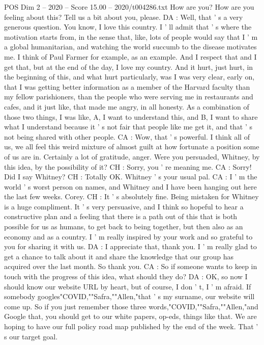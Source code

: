 \begin{textsample}{POS Dim 2 – 2020 – Score 15.00 – 2020/t004286.txt}
How are you?
How are you feeling about this?
Tell us a bit about you, please.
DA : Well, that ' s a very generous question.
You know, I love this country.
I ' ll admit that ' s where the motivation starts from, in the sense that, like, lots of people would say that I ' m a global humanitarian, and watching the world succumb to the disease motivates me.
I think of Paul Farmer for example, as an example.
And I respect that and I get that, but at the end of the day, I love my country.
And it hurt, just hurt, in the beginning of this, and what hurt particularly, was I was very clear, early on, that I was getting better information as a member of the Harvard faculty than my fellow parishioners, than the people who were serving me in restaurants and cafes, and it just like, that made me angry, in all honesty.
As a combination of those two things, I was like, A, I want to understand this, and B, I want to share what I understand because it ' s not fair that people like me get it, and that ' s not being shared with other people.
CA : Wow, that ' s powerful.
I think all of us, we all feel this weird mixture of almost guilt at how fortunate a position some of us are in.
Certainly a lot of gratitude, anger.
Were you persuaded, Whitney, by this idea, by the possibility of it?
CH : Sorry, you ' re meaning me.
CA : Sorry!
Did I say Whitney?
CH : Totally OK.
Whitney ' s your usual pal.
CA : I ' m the world ' s worst person on names, and Whitney and I have been hanging out here the last few weeks.
Corey.
CH : It ' s absolutely fine.
Being mistaken for Whitney is a huge compliment.
It ' s very persuasive, and I think so hopeful to hear a constructive plan and a feeling that there is a path out of this that is both possible for us as humans, to get back to being together, but then also as an economy and as a country.
I ' m really inspired by your work and so grateful to you for sharing it with us.
DA : I appreciate that, thank you.
I ' m really glad to get a chance to talk about it and share the knowledge that our group has acquired over the last month.
So thank you.
CA : So if someone wants to keep in touch with the progress of this idea, what should they do?
DA : OK, so now I should know our website URL by heart, but of course, I don ' t, I ' m afraid.
If somebody googles"COVID,""Safra,""Allen,"that ' s my surname, our website will come up.
So if you just remember those three words,"COVID,""Safra,""Allen,"and Google that, you should get to our white papers, op-eds, things like that.
We are hoping to have our full policy road map published by the end of the week.
That ' s our target goal.

\end{textsample}
